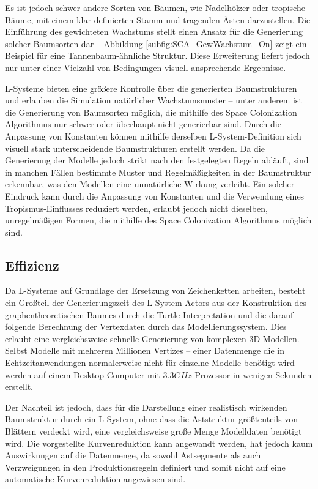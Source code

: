 Es ist jedoch schwer andere Sorten von Bäumen, wie Nadelhölzer oder tropische Bäume, mit einem klar definierten Stamm und tragenden Ästen darzustellen. Die Einführung des gewichteten Wachstums stellt einen Ansatz für die Generierung solcher Baumsorten dar -- Abbildung \ref{subfig:SCA_GewWachstum_On} zeigt ein Beispiel für eine Tannenbaum-ähnliche Struktur. Diese Erweiterung liefert jedoch nur unter einer Vielzahl von Bedingungen visuell ansprechende Ergebnisse.

L-Systeme bieten eine größere Kontrolle über die generierten Baumstrukturen und erlauben die Simulation natürlicher Wachstumsmuster -- unter anderem ist die Generierung von Baumsorten möglich, die mithilfe des Space Colonization Algorithmus nur schwer oder überhaupt nicht generierbar sind. Durch die Anpassung von Konstanten können mithilfe derselben L-System-Definition sich visuell stark unterscheidende Baumstrukturen erstellt werden. Da die Generierung der Modelle jedoch strikt nach den festgelegten Regeln abläuft, sind in manchen Fällen bestimmte Muster und Regelmäßigkeiten in der Baumstruktur erkennbar, was den Modellen eine unnatürliche Wirkung verleiht. Ein solcher Eindruck kann durch die Anpassung von Konstanten und die Verwendung eines Tropismus-Einflusses reduziert werden, erlaubt jedoch nicht dieselben, unregelmäßigen Formen, die mithilfe des Space Colonization Algorithmus möglich sind. \cite[S.6]{SpaceColonizationAlgorithm:07}

\subsection{Effizienz}

Da L-Systeme auf Grundlage der Ersetzung von Zeichenketten arbeiten, besteht ein Großteil der Generierungszeit des L-System-Actors aus der Konstruktion des graphentheoretischen Baumes durch die Turtle-Interpretation und die darauf folgende Berechnung der Vertexdaten durch das Modellierungssystem. Dies erlaubt eine vergleichsweise schnelle Generierung von komplexen 3D-Modellen. Selbst Modelle mit mehreren Millionen Vertizes -- einer Datenmenge die in Echtzeitanwendungen normalerweise nicht für einzelne Modelle benötigt wird -- werden auf einem Desktop-Computer mit $3.3GHz$-Prozessor in wenigen Sekunden erstellt.

Der Nachteil ist jedoch, dass für die Darstellung einer realistisch wirkenden Baumstruktur durch ein L-System, ohne dass die Aststruktur größtenteils von Blättern verdeckt wird, eine vergleichsweise große Menge Modelldaten benötigt wird. Die vorgestellte Kurvenreduktion kann angewandt werden, hat jedoch kaum Auswirkungen auf die Datenmenge, da sowohl Astsegmente als auch Verzweigungen in den Produktionsregeln definiert und somit nicht auf eine automatische Kurvenreduktion angewiesen sind.

